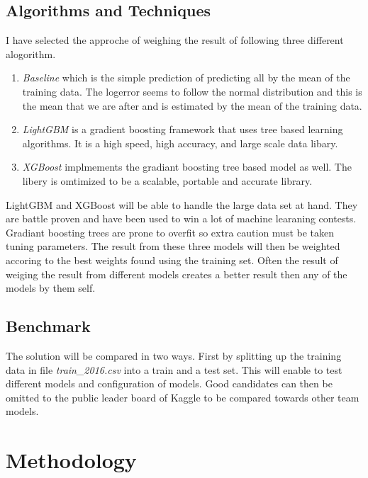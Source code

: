 \documentclass[a4paper]{article}
\begin{document}
\subsection{Algorithms and Techniques}
I have selected the approche of weighing the result of following three different alogorithm.
\begin{enumerate}
    \item
        \textit{Baseline} which is the simple prediction of predicting all by the mean of the training data.
        The logerror seems to follow the normal distribution and this is the mean that we are after and is estimated
        by the mean of the training data.
    \item
        \textit{LightGBM} is a gradient boosting framework that uses tree based learning algorithms. It is a
        high speed, high accuracy, and large scale data libary.
    \item
        \textit{XGBoost} implmements the gradiant boosting tree based model as well. The libery is omtimized to
        be a scalable, portable and accurate library.
\end{enumerate}
LightGBM and XGBoost will be able to handle the large data set at hand. They are battle proven and have been used to
win a lot of machine learaning contests. Gradiant boosting trees are prone to overfit so extra caution must be
taken tuning parameters. The result from these three models will then be weighted accoring to the best weights
found using the training set. Often the result of weiging the result from different models creates a better result
then any of the models by them self.

\subsection{Benchmark}
The solution will be compared in two ways. First by splitting up the training data in file \textit{train\_2016.csv}
into a train and a test set. This will enable to test different models and configuration of models. Good candidates
can then be omitted to the public leader board of Kaggle to be compared towards other team models.

\section{Methodology}
\end{document}
